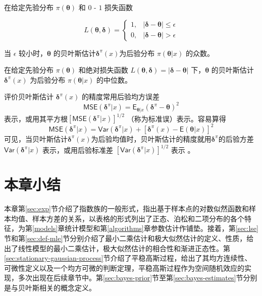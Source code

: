 \documentclass[12pt,a4paper,UTF8,twoside]{book}
\theoremstyle{definition}
\theoremstyle{definition}
\theoremstyle{definition}
\theoremstyle{remark}
\let\BeginKnitrBlock\begin \let\EndKnitrBlock\end
\begin{document}
\BeginKnitrBlock{theorem}[0 - 1 损失]
\protect\hypertarget{thm:bayes-estimate-01}{}{\label{thm:bayes-estimate-01} {} }在给定先验分布 \(\pi(\boldsymbol{\theta})\) 和 \(0\) - \(1\) 损失函数

\begin{equation*}
L(\boldsymbol{\theta},\boldsymbol{\delta}) = 
\begin{cases}
1, & | \boldsymbol{\delta} - \boldsymbol{\theta}| \leq \epsilon \\
0, & | \boldsymbol{\delta} - \boldsymbol{\theta}| > \epsilon
\end{cases}
\end{equation*}

当 \(\epsilon\) 较小时，\(\boldsymbol{\theta}\) 的贝叶斯估计\(\boldsymbol{\delta}^{\pi}(x)\)为后验分布 \(\pi(\boldsymbol{\theta}|x)\) 的众数\citep{mao2006}。
\EndKnitrBlock{theorem}

\BeginKnitrBlock{theorem}[绝对值损失]
\protect\hypertarget{thm:bayes-estimate-abs}{}{\label{thm:bayes-estimate-abs} {} }在给定先验分布 \(\pi(\boldsymbol{\theta})\) 和绝对损失函数 \(L(\boldsymbol{\theta},\boldsymbol{\delta}) = |\boldsymbol{\delta} - \boldsymbol{\theta}|\) 下，\(\boldsymbol{\theta}\) 的贝叶斯估计 \(\boldsymbol{\delta}^{\pi}(x)\) 为后验分布 \(\pi(\boldsymbol{\theta}|x)\) 的中位数\citep{mao2006}。
\EndKnitrBlock{theorem}

评价贝叶斯估计 \(\boldsymbol{\delta}^{\pi}(x)\) 的精度常用后验均方误差
\[\mathsf{MSE}(\boldsymbol{\delta}^{\pi}|x) = \mathsf{E}_{\boldsymbol{\theta}|x}(\boldsymbol{\delta}^{\pi} - \boldsymbol{\theta})^2\]
表示，或用其平方根\([\mathsf{MSE}(\boldsymbol{\delta}^{\pi}|x)]^{1/2}\) （称为标准误）表示。容易算得
\[\mathsf{MSE}(\boldsymbol{\delta}^{\pi}|x) = \mathsf{Var}(\boldsymbol{\delta}^{\pi}|x) + [\boldsymbol{\delta}^{\pi}(x) - \mathsf{E}(\boldsymbol{\theta}|x)]^2\]
可见，当贝叶斯估计\(\boldsymbol{\delta}^{\pi}(x)\)为后验均值时，贝叶斯估计的精度就用\(\boldsymbol{\delta}^{\pi}\)的后验方差\(\mathsf{Var}(\boldsymbol{\delta}^{\pi}|x)\) 表示，或用后验标准差 \([\mathsf{Var}(\boldsymbol{\delta}^{\pi}|x)]^{1/2}\) 表示 \citep{mao2006}。

\hypertarget{sec:foundations}{%
\section{本章小结}\label{sec:foundations}}

本章第\ref{sec:exp}节介绍了指数族的一般形式，指出基于样本点的对数似然函数和样本均值、样本方差的关系，以表格的形式列出了正态、泊松和二项分布的各个特征，为第\ref{models}章统计模型和第\ref{algorithms}章参数估计作铺垫。接着，第\ref{sec:lse}节和第\ref{sec:def-mle}节分别介绍了最小二乘估计和极大似然估计的定义、性质，给出了线性模型的最小二乘估计，极大似然估计的相合性和渐进正态性。第\ref{sec:stationary-gaussian-process}节介绍了平稳高斯过程，给出了其均方连续性、可微性定义以及一个均方可微的判断定理，平稳高斯过程作为空间随机效应的实现，多次出现在后续章节中。第\ref{sec:bayes-prior}节至第\ref{sec:bayes-estimates}节分别是与贝叶斯相关的概念定义。
\end{document}
